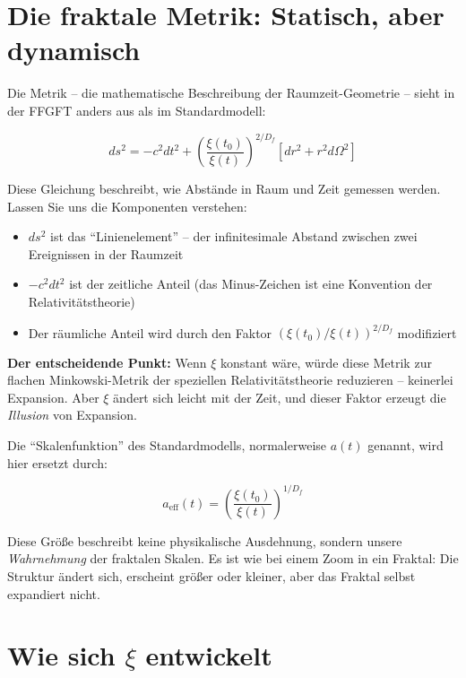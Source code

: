 \section{Die fraktale Metrik: Statisch, aber dynamisch}

Die Metrik -- die mathematische Beschreibung der Raumzeit-Geometrie -- sieht in der FFGFT anders aus als im Standardmodell:

\begin{equation}
ds^2 = -c^2 dt^2 + \left(\frac{\xi(t_0)}{\xi(t)}\right)^{2/D_f} \left[dr^2 + r^2 d\Omega^2\right]
\end{equation}

Diese Gleichung beschreibt, wie Abstände in Raum und Zeit gemessen werden. Lassen Sie uns die Komponenten verstehen:

\begin{itemize}[leftmargin=*]
\item $ds^2$ ist das \enquote{Linienelement} -- der infinitesimale Abstand zwischen zwei Ereignissen in der Raumzeit
\item $-c^2 dt^2$ ist der zeitliche Anteil (das Minus-Zeichen ist eine Konvention der Relativitätstheorie)
\item Der räumliche Anteil wird durch den Faktor $(\xi(t_0)/\xi(t))^{2/D_f}$ modifiziert
\end{itemize}

\textbf{Der entscheidende Punkt:} Wenn $\xi$ konstant wäre, würde diese Metrik zur flachen Minkowski-Metrik der speziellen Relativitätstheorie reduzieren -- keinerlei Expansion. Aber $\xi$ ändert sich leicht mit der Zeit, und dieser Faktor erzeugt die \textit{Illusion} von Expansion.

Die \enquote{Skalenfunktion} des Standardmodells, normalerweise $a(t)$ genannt, wird hier ersetzt durch:

\begin{equation}
a_{\text{eff}}(t) = \left(\frac{\xi(t_0)}{\xi(t)}\right)^{1/D_f}
\end{equation}

Diese Größe beschreibt keine physikalische Ausdehnung, sondern unsere \textit{Wahrnehmung} der fraktalen Skalen. Es ist wie bei einem Zoom in ein Fraktal: Die Struktur ändert sich, erscheint größer oder kleiner, aber das Fraktal selbst expandiert nicht.

\section{Wie sich $\xi$ entwickelt}

